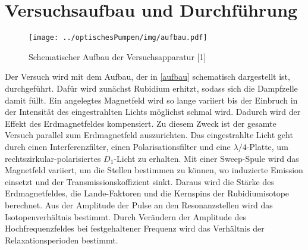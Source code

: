 \section{Versuchsaufbau und Durchführung}

\begin{figure}[h]
\centering
\texttt{[image: ../optischesPumpen/img/aufbau.pdf]}
\caption{Schematischer Aufbau der Versuchsapparatur [1]}
\label{aufbau}
\end{figure}

Der Versuch wird mit dem Aufbau, der in \autoref{aufbau} schematisch dargestellt ist, durchgeführt. Dafür wird zunächst
Rubidium erhitzt, sodass sich die Dampfzelle damit füllt. Ein angelegtes Magnetfeld wird so lange variiert bis der Einbruch
in der Intensität des eingestrahlten Lichts möglichst schmal wird. Dadurch wird der Effekt des Erdmagnetfeldes kompensiert.
Zu diesem Zweck ist der gesamte Versuch parallel zum Erdmagnetfeld auszurichten. Das eingestrahlte Licht geht durch einen
Interferenzfilter, einen Polarisationsfilter und eine $\lambda/4$-Platte, um rechtszirkular-polarisiertes $D_1$-Licht zu
erhalten. Mit einer Sweep-Spule wird das Magnetfeld variiert, um die Stellen bestimmen zu können, wo induzierte Emission
einsetzt und der Transmissionskoffizient sinkt. Daraus wird die Stärke des Erdmagnetfeldes, die Lande-Faktoren und die
Kernspins der Rubidiumisotope berechnet. Aus der Amplitude der Pulse an den Resonanzstellen wird das Isotopenverhältnis
bestimmt. Durch Verändern der Amplitude des Hochfrequenzfeldes bei festgehaltener Frequenz wird das Verhältnis der
Relaxationsperioden bestimmt.

